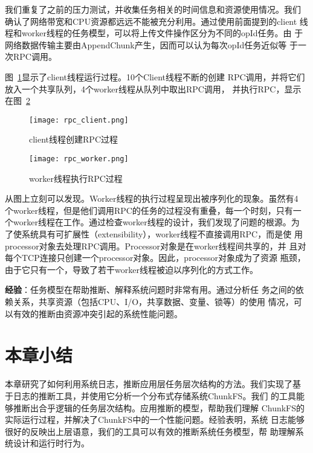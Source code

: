 我们重复了之前的压力测试，并收集任务相关的时间信息和资源使用情况。我们
确认了网络带宽和CPU资源都远远不能被充分利用。通过使用前面提到的client
线程和worker线程的任务模型，可以将上传文件操作区分为不同的opId任务。由
于网络数据传输主要由Append\-Chunk产生，因而可以认为每次opId任务近似等
于一次RPC调用。


图~\ref{fig:rpc_client}显示了client线程运行过程。10个Client线程不断的创建
RPC调用，并将它们放入一个共享队列，4个worker线程从队列中取出RPC调用，
并执行RPC，显示在图~\ref{fig:rpc_worker}
 
\begin{figure}[htbp]
  \centering
  \begin{minipage}{0.8\linewidth}
    \centering
    \texttt{[image: rpc\_client.png]}
    \caption{client线程创建RPC过程}
    \label{fig:rpc_client}
  \end{minipage}
\end{figure}

\begin{figure}[htbp]
  \centering
  \begin{minipage}{0.8\linewidth}
    \centering
    \texttt{[image: rpc\_worker.png]}
    \caption{worker线程执行RPC过程}
    \label{fig:rpc_worker}
  \end{minipage}
\end{figure}

从图上立刻可以发现。Worker线程的执行过程呈现出被序列化的现象。虽然有4
个worker线程，但是他们调用RPC的任务的过程没有重叠，每一个时刻，只有一
个worker线程在工作。通过检查worker线程的设计，我们发现了问题的根源。为
了使系统具有可扩展性（extensibility），worker线程不直接调用RPC，而是使
用processor对象去处理RPC调用。Processor对象是在worker线程间共享的，并
且对每个TCP连接只创建一个processor对象。因此，processor对象成为了资源
瓶颈，由于它只有一个，导致了若干worker线程被迫以序列化的方式工作。

\textbf{经验}：任务模型在帮助推断、解释系统问题时非常有用。通过分析任
务之间的依赖关系，共享资源（包括CPU、I/O，共享数据、变量、锁等）的使用
情况，可以有效的推断由资源冲突引起的系统性能问题。

\section{本章小结}
\label{lm_conclusion}

本章研究了如何利用系统日志，推断应用层任务层次结构的方法。我们实现了基
于日志的推断工具，并使用它分析一个分布式存储系统ChunkFS。我们
的工具能够推断出合乎逻辑的任务层次结构。应用推断的模型，帮助我们理解
ChunkFS的实际运行过程，并解决了ChunkFS中的一个性能问题。经验表明，系统
日志能够很好的反映出上层语意，我们的工具可以有效的推断系统任务模型，帮
助理解系统设计和运行时行为。

